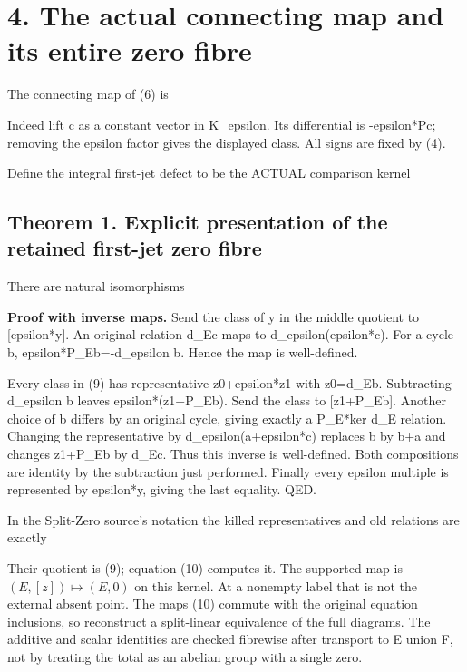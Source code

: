 \section{4. The actual connecting map and its entire zero fibre}

The connecting map of (6) is


Indeed lift c as a constant vector in K\_epsilon. Its differential is
-epsilon*Pc; removing the epsilon factor gives the displayed class. All
signs are fixed by (4).

Define the integral first-jet defect to be the ACTUAL comparison kernel


\subsection{Theorem 1. Explicit presentation of the retained first-jet
zero fibre}

There are natural isomorphisms


\textbf{Proof with inverse maps.} Send the class of y in the middle
quotient to {[}epsilon*y{]}. An original relation d\_Ec maps to
d\_epsilon(epsilon*c). For a cycle b, epsilon*P\_Eb=-d\_epsilon b. Hence
the map is well-defined.

Every class in (9) has representative z0+epsilon*z1 with z0=d\_Eb.
Subtracting d\_epsilon b leaves epsilon*(z1+P\_Eb). Send the class to
{[}z1+P\_Eb{]}. Another choice of b differs by an original cycle, giving
exactly a P\_E*ker d\_E relation. Changing the representative by
d\_epsilon(a+epsilon*c) replaces b by b+a and changes z1+P\_Eb by d\_Ec.
Thus this inverse is well-defined. Both compositions are identity by the
subtraction just performed. Finally every epsilon multiple is
represented by epsilon*y, giving the last equality. QED.

In the Split-Zero source's notation the killed representatives and old
relations are exactly


Their quotient is (9); equation (10) computes it. The supported map is
\((E,[z])\mapsto(E,0)\) on this kernel. At a nonempty label that is not
the external absent point. The maps (10) commute with the original
equation inclusions, so reconstruct a split-linear equivalence of the
full diagrams. The additive and scalar identities are checked fibrewise
after transport to E union F, not by treating the total as an abelian
group with a single zero.


